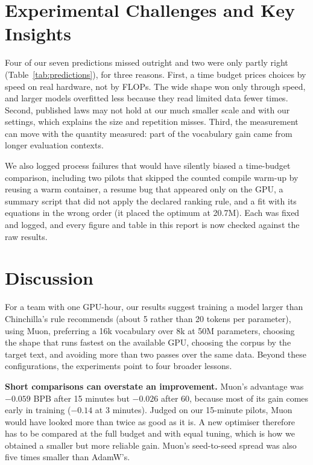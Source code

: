 \documentclass[11pt,a4paper]{article}
\begin{document}
\section{Experimental Challenges and Key Insights}\label{sec:insights}

Four of our seven predictions missed outright and two were only partly right (Table~\ref{tab:predictions}), for three reasons. First, a time budget prices choices by speed on real hardware, not by FLOPs. The wide shape won only through speed, and larger models overfitted less because they read limited data fewer times. Second, published laws may not hold at our much smaller scale and with our settings, which explains the size and repetition misses. Third, the measurement can move with the quantity measured: part of the vocabulary gain came from longer evaluation contexts.

We also logged process failures that would have silently biased a time-budget comparison, including two pilots that skipped the counted compile warm-up by reusing a warm container, a resume bug that appeared only on the GPU, a summary script that did not apply the declared ranking rule, and a fit with its equations in the wrong order (it placed the optimum at 20.7M). Each was fixed and logged, and every figure and table in this report is now checked against the raw results.

\section{Discussion}

For a team with one GPU-hour, our results suggest training a model larger than Chinchilla's rule recommends (about 5 rather than 20 tokens per parameter), using Muon, preferring a 16k vocabulary over 8k at 50M parameters, choosing the shape that runs fastest on the available GPU, choosing the corpus by the target text, and avoiding more than two passes over the same data. Beyond these configurations, the experiments point to four broader lessons.

\textbf{Short comparisons can overstate an improvement.} Muon's advantage was $-0.059$ BPB after 15 minutes but $-0.026$ after 60, because most of its gain comes early in training ($-0.14$ at 3 minutes). Judged on our 15-minute pilots, Muon would have looked more than twice as good as it is. A new optimiser therefore has to be compared at the full budget and with equal tuning, which is how we obtained a smaller but more reliable gain. Muon's seed-to-seed spread was also five times smaller than AdamW's.
\end{document}
